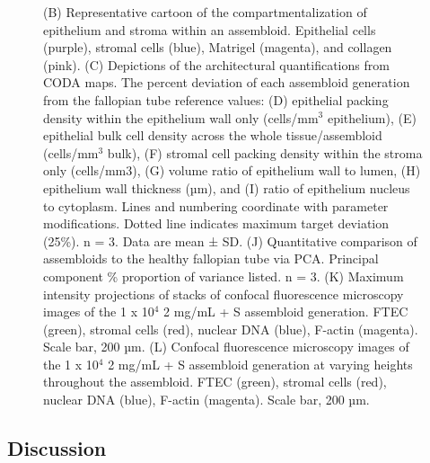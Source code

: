 \begin{refsection}
    \begin{figure}[h!]
        \ContinuedFloat
        \captionsetup{font=small}
        \caption[]{(B) Representative cartoon of the compartmentalization of epithelium and stroma within an assembloid. Epithelial cells (purple), stromal cells (blue), Matrigel (magenta), and collagen (pink). (C) Depictions of the architectural quantifications from CODA maps. The percent deviation of each assembloid generation from the fallopian tube reference values: (D) epithelial packing density within the epithelium wall only (cells/mm$^3$ epithelium), (E) epithelial bulk cell density across the whole tissue/assembloid (cells/mm$^3$ bulk), (F) stromal cell packing density within the stroma only (cells/mm3), (G) volume ratio of epithelium wall to lumen, (H) epithelium wall thickness (µm), and (I) ratio of epithelium nucleus to cytoplasm. Lines and numbering coordinate with parameter modifications. Dotted line indicates maximum target deviation (25\%). n = 3. Data are mean ± SD. (J) Quantitative comparison of assembloids to the healthy fallopian tube via PCA. Principal component \% proportion of variance listed. n = 3. (K) Maximum intensity projections of stacks of confocal fluorescence microscopy images of the 1 x 10$^4$ 2 mg/mL + S assembloid generation. FTEC (green), stromal cells (red), nuclear DNA (blue), F-actin (magenta). Scale bar, 200 µm. (L) Confocal fluorescence microscopy images of the 1 x 10$^4$ 2 mg/mL + S assembloid generation at varying heights throughout the assembloid. FTEC (green), stromal cells (red), nuclear DNA (blue), F-actin (magenta). Scale bar, 200 µm.}
    \end{figure}

    \FloatBarrier
    \subsection{Discussion}
    

\end{refsection}
